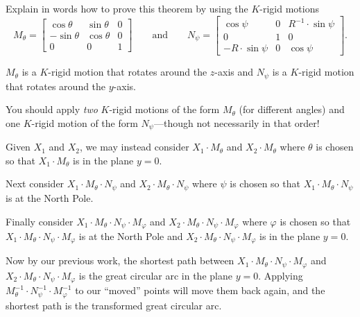 \documentclass{ximera}
\begin{document}
\begin{problem}
  Explain in words how to prove this theorem by using the $K$-rigid
  motions
  \[
  M_\theta=
  \begin{bmatrix}
    \cos\theta & \sin\theta & 0\\
    -\sin\theta & \cos\theta & 0\\
    0 & 0 & 1
  \end{bmatrix}
  \qquad\text{and}\qquad
  N_\psi=
  \begin{bmatrix}
    \cos\psi & 0 & R^{-1}\cdot\sin\psi\\
    0 & 1 & 0\\
    -R\cdot\sin\psi & 0 & \cos\psi
  \end{bmatrix}.
  \]
  \begin{hint}
    $M_\theta$ is a $K$-rigid motion that rotates around the $z$-axis and
    $N_\psi$ is a $K$-rigid motion that rotates around the $y$-axis.
  \end{hint}
  \begin{hint}
    You should apply \textit{two} $K$-rigid motions of the form
    $M_\theta$ (for different angles) and one $K$-rigid motion of the
    form $N_\psi$---though not necessarily in that order!
  \end{hint}
  \begin{freeResponse}
    Given $X_1$ and $X_2$, we may instead consider $X_1\cdot M_\theta$
    and $X_2\cdot M_\theta$ where $\theta$ is chosen so that $X_1\cdot
    M_\theta$ is in the plane $y=0$.

    Next consider $X_1\cdot M_\theta\cdot N_\psi$ and $X_2\cdot
    M_\theta\cdot N_\psi$ where $\psi$ is chosen so that $X_1\cdot
    M_\theta\cdot N_\psi$ is at the North Pole.

    Finally consider $X_1\cdot M_\theta\cdot N_\psi\cdot M_\varphi$
    and $X_2\cdot M_\theta\cdot N_\psi\cdot M_\varphi$ where $\varphi$
    is chosen so that $X_1\cdot M_\theta\cdot N_\psi\cdot M_\varphi$
    is at the North Pole and $X_2\cdot M_\theta\cdot N_\psi\cdot
    M_\varphi$ is in the plane $y=0$.

    Now by our previous work, the shortest path between $X_1\cdot
    M_\theta\cdot N_\psi\cdot M_\varphi$ and $X_2\cdot M_\theta\cdot
    N_\psi\cdot M_\varphi$ is the great circular arc in the plane
    $y=0$. Applying $M_\theta^{-1}\cdot N_\psi^{-1}\cdot
    M_\varphi^{-1}$ to our ``moved'' points will move them back again,
    and the shortest path is the transformed great circular arc.
  \end{freeResponse}
\end{problem}
\end{document}
